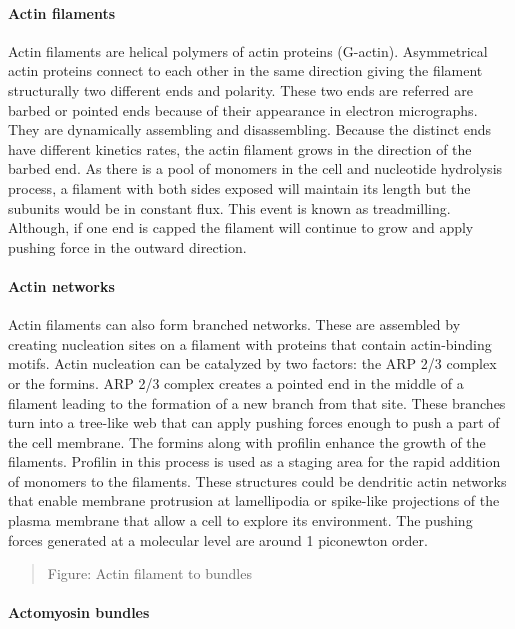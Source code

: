 \documentclass[
]{article}
\begin{document}
\hypertarget{actin-filaments}{%
\paragraph{Actin filaments}\label{actin-filaments}}

Actin filaments are helical polymers of actin proteins (G-actin).
Asymmetrical actin proteins connect to each other in the same direction
giving the filament structurally two different ends and polarity. These
two ends are referred are barbed or pointed ends because of their
appearance in electron micrographs. They are dynamically assembling and
disassembling. Because the distinct ends have different kinetics rates,
the actin filament grows in the direction of the barbed end. As there is
a pool of monomers in the cell and nucleotide hydrolysis process, a
filament with both sides exposed will maintain its length but the
subunits would be in constant flux. This event is known as treadmilling.
Although, if one end is capped the filament will continue to grow and
apply pushing force in the outward direction.

\hypertarget{actin-networks}{%
\paragraph{Actin networks}\label{actin-networks}}

Actin filaments can also form branched networks. These are assembled by
creating nucleation sites on a filament with proteins that contain
actin-binding motifs. Actin nucleation can be catalyzed by two factors:
the ARP 2/3 complex or the formins. ARP 2/3 complex creates a pointed
end in the middle of a filament leading to the formation of a new branch
from that site. These branches turn into a tree-like web that can apply
pushing forces enough to push a part of the cell membrane. The formins
along with profilin enhance the growth of the filaments. Profilin in
this process is used as a staging area for the rapid addition of
monomers to the filaments. These structures could be dendritic actin
networks that enable membrane protrusion at lamellipodia or spike-like
projections of the plasma membrane that allow a cell to explore its
environment. The pushing forces generated at a molecular level are
around 1 piconewton order.

\begin{quote}
Figure: Actin filament to bundles
\end{quote}

\hypertarget{actomyosin-bundles}{%
\paragraph{Actomyosin bundles}\label{actomyosin-bundles}}
\end{document}
